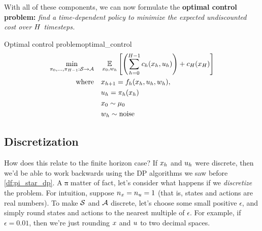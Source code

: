 \documentclass[../main/main]{subfiles}
\begin{document}
With all of these components, we can now formulate the \textbf{optimal control problem:} \emph{find a time-dependent policy to minimize the expected undiscounted cost over $\hor$ timesteps.}

\begin{definition}{Optimal control problem}{optimal_control}
    \begin{equation}
        \begin{split}
            \min_{\pi_0, \dots, \pi_{\hor-1} : \S \to \A} \quad & \E_{\st_0, w_\hi} \left[
                \left( \sum_{\hi=0}^{\hor-1} c_\hi(\st_\hi, \act_\hi) \right) + c_\hor(\st_\hor)
            \right] \\
            \text{where} \quad & \st_{\hi+1} = f_\hi(\st_\hi, \act_\hi, w_\hi), \\
            & \act_\hi = \pi_\hi(\st_\hi) \\
            & \st_0 \sim \mu_0 \\
            & w_\hi \sim \text{noise}
        \end{split}
    \end{equation}
\end{definition}


\subsection{Discretization}

How does this relate to the finite horizon case?
If $\st_\hi$ and $\act_\hi$ were discrete, then we'd be able to work backwards using
the DP algorithms we saw before \eqref{df:pi_star_dp}.
A \st a matter of fact, let's consider what happens if we \emph{discretize} the
problem. For intuition, suppose $n_\st = n_\act = 1$ (that is, states and actions are real numbers).
To make $\S$ and $\A$ discrete, let's choose some small positive $\epsilon$,
and simply round states and actions to the nearest multiple of
$\epsilon$. For example, if $\epsilon = 0.01$, then we're just rounding $\st$ and $\act$ to two decimal spaces.
\end{document}
